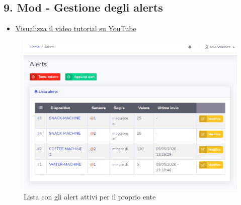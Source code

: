 \newpage \subsection{9. Mod - Gestione degli alerts}
	
	\begin{itemize}
		\item \href{https://www.youtube.com/watch?v=PjySMOLCtMA&list=PLPKYjnuIh1FA3b3jn_bwY_ztYzaFn2mIT&index=12}{Visualizza il video tutorial su YouTube} 
	\end{itemize}

	\begin{figure}[H]
		\centering
		\includegraphics[scale=0.600]{res/images/mod/listaAlerts.png}
		\caption{Lista con gli alert attivi per il proprio ente}
	\end{figure}

